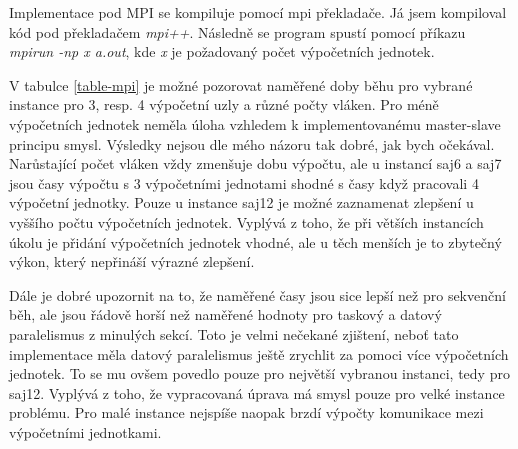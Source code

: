 \documentclass{article} \oddsidemargin=-5mm
\begin{document}
Implementace pod MPI se kompiluje pomocí mpi překladače. Já jsem kompiloval kód pod překladačem \textit{mpi++}. Následně se program spustí pomocí příkazu \textit{mpirun -np x a.out}, kde \textit{x} je požadovaný počet výpočetních jednotek.

V tabulce \ref{table-mpi} je možné pozorovat naměřené doby běhu pro vybrané instance pro 3, resp. 4 výpočetní uzly a různé počty vláken. Pro méně výpočetních jednotek neměla úloha vzhledem k implementovanému master-slave principu smysl. Výsledky nejsou dle mého názoru tak dobré, jak bych očekával. Narůstající počet vláken vždy zmenšuje dobu výpočtu, ale u instancí saj6 a saj7 jsou časy výpočtu s 3 výpočetními jednotami shodné s časy když pracovali 4 výpočetní jednotky. Pouze u instance saj12 je možné zaznamenat zlepšení u vyššího počtu výpočetních jednotek. Vyplývá z toho, že při větších instancích úkolu je přidání výpočetních jednotek vhodné, ale u těch menších je to zbytečný výkon, který nepřináší výrazné zlepšení.

Dále je dobré upozornit na to, že naměřené časy jsou sice lepší než pro sekvenční běh, ale jsou řádově horší než naměřené hodnoty pro taskový a datový paralelismus z minulých sekcí. Toto je velmi nečekané zjištení, neboť tato implementace měla datový paralelismus ještě zrychlit za pomoci více výpočetních jednotek. To se mu ovšem povedlo pouze pro největší vybranou instanci, tedy pro saj12. Vyplývá z toho, že vypracovaná úprava má smysl pouze pro velké instance problému. Pro malé instance nejspíše naopak brzdí výpočty komunikace mezi výpočetními jednotkami. 
\end{document}
